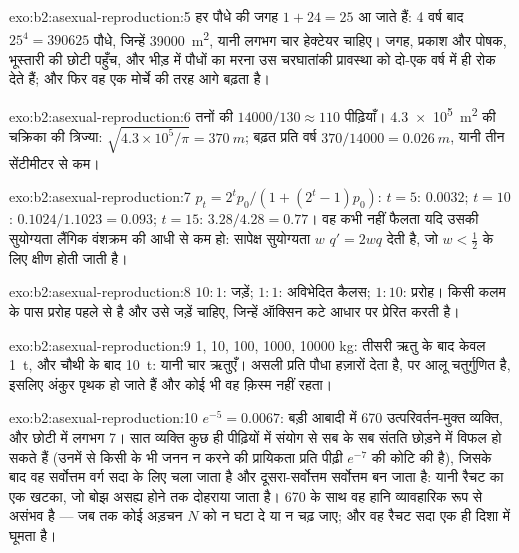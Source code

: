 \begin{solution}{exo:b2:asexual-reproduction:5}
हर पौधे की जगह $1 + 24 = 25$ आ जाते हैं: 4 वर्ष बाद $25^{4} =
\num{390625}$ पौधे, जिन्हें \qty{39000}{m^2}, यानी लगभग चार हेक्टेयर चाहिए।
जगह, प्रकाश और पोषक, भूस्तारी की छोटी पहुँच, और भीड़ में पौधों का
मरना उस चरघातांकी प्रावस्था को दो-एक वर्ष में ही रोक देते हैं; और फिर वह
 एक मोर्चे की तरह आगे बढ़ता है।
\end{solution}

\begin{solution}{exo:b2:asexual-reproduction:6}
तनों की $\num{14000}/130 \approx 110$ पीढ़ियाँ। \qty{4.3e5}{m^2} की
चक्रिका की त्रिज्या: $\sqrt{4.3\times 10^{5}/\pi} = \qty{370}{m}$;
बढ़त प्रति वर्ष $370/\num{14000} = \qty{0.026}{m}$, यानी तीन
सेंटीमीटर से कम।
\end{solution}

\begin{solution}{exo:b2:asexual-reproduction:7}
$p_t = 2^{t}p_0/(1 + (2^{t} - 1)p_0)$: $t = 5$: $0.0032$; $t = 10$:
$0.1024/1.1023 = 0.093$; $t = 15$: $3.28/4.28 = 0.77$। वह कभी नहीं
फैलता यदि उसकी सुयोग्यता लैंगिक वंशक्रम की आधी से कम हो: सापेक्ष
सुयोग्यता $w$ $q' = 2wq$ देती है, जो $w <
\tfrac12$ के लिए क्षीण होती जाती है।
\end{solution}

\begin{solution}{exo:b2:asexual-reproduction:8}
$10 : 1$: जड़ें; $1 : 1$: अविभेदित कैलस; $1 : 10$: प्ररोह।
किसी कलम के पास प्ररोह पहले से है और उसे जड़ें चाहिए, जिन्हें ऑक्सिन
कटे आधार पर प्रेरित करती है।
\end{solution}

\begin{solution}{exo:b2:asexual-reproduction:9}
1, 10, 100, \num{1000}, \num{10000} kg: तीसरी ऋतु के बाद केवल
\qty{1}{t}, और चौथी के बाद \qty{10}{t}: यानी चार ऋतुएँ। असली 
प्रति पौधा हज़ारों  देता है, पर आलू 
चतुर्गुणित है, इसलिए अंकुर पृथक हो जाते हैं और कोई भी वह क़िस्म नहीं रहता।
\end{solution}

\begin{solution}{exo:b2:asexual-reproduction:10}
$e^{-5} = 0.0067$: बड़ी आबादी में 670 उत्परिवर्तन-मुक्त व्यक्ति,
और छोटी में लगभग 7। सात व्यक्ति कुछ ही पीढ़ियों में संयोग से सब के सब
संतति छोड़ने में विफल हो सकते हैं (उनमें से किसी के भी जनन न करने की
प्रायिकता प्रति पीढ़ी $e^{-7}$ की कोटि की है), जिसके बाद वह सर्वोत्तम
वर्ग सदा के लिए चला जाता है और दूसरा-सर्वोत्तम सर्वोत्तम बन जाता है:
यानी रैचट का एक खटका, जो बोझ असह्य होने तक दोहराया जाता है। 670 के साथ
वह हानि व्यावहारिक रूप से असंभव है --- जब तक कोई अड़चन $N$ को न घटा दे
या  न चढ़ जाए; और वह रैचट सदा एक ही दिशा में घूमता है।
\end{solution}

